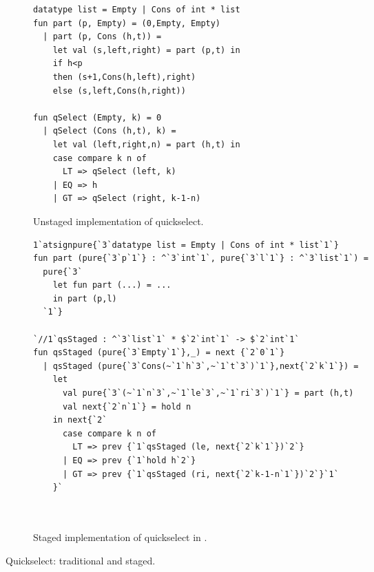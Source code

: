 
\begin{figure*}
\begin{subfigure}{0.5\textwidth}
\begin{lstlisting} 
datatype list = Empty | Cons of int * list
fun part (p, Empty) = (0,Empty, Empty) 
  | part (p, Cons (h,t)) = 
    let val (s,left,right) = part (p,t) in 
    if h<p 
    then (s+1,Cons(h,left),right) 
    else (s,left,Cons(h,right))

fun qSelect (Empty, k) = 0
  | qSelect (Cons (h,t), k) =
    let val (left,right,n) = part (h,t) in
    case compare k n of
      LT => qSelect (left, k)
    | EQ => h
    | GT => qSelect (right, k-1-n)
\end{lstlisting}
\caption{Unstaged implementation of quickselect.}
\label{fig:qs-unstaged}
\end{subfigure}%
\begin{subfigure}{0.5\textwidth}
\begin{lstlisting} 
1`atsignpure{`3`datatype list = Empty | Cons of int * list`1`}
fun part (pure{`3`p`1`} : ^`3`int`1`, pure{`3`l`1`} : ^`3`list`1`) =
  pure{`3` 
    let fun part (...) = ...
    in part (p,l)
  `1`} 

`//1`qsStaged : ^`3`list`1` * $`2`int`1` -> $`2`int`1`
fun qsStaged (pure{`3`Empty`1`},_) = next {`2`0`1`}
  | qsStaged (pure{`3`Cons(~`1`h`3`,~`1`t`3`)`1`},next{`2`k`1`}) = 
    let 
      val pure{`3`(~`1`n`3`,~`1`le`3`,~`1`ri`3`)`1`} = part (h,t)
      val next{`2`n`1`} = hold n 
    in next{`2`
      case compare k n of
        LT => prev {`1`qsStaged (le, next{`2`k`1`})`2`}
      | EQ => prev {`1`hold h`2`}
      | GT => prev {`1`qsStaged (ri, next{`2`k-1-n`1`})`2`}`1`
    }`



\end{lstlisting}
\caption{Staged implementation of quickselect in \lang.}
\vspace{4.8em}
\label{fig:qs-staged}
\end{subfigure}
\caption{Quickselect: traditional and staged.}
\end{figure*}


